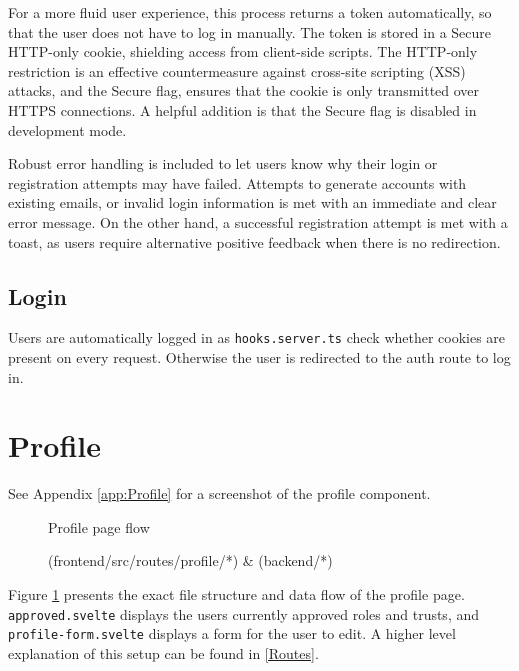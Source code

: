 For a more fluid user experience, this process returns a token automatically, so that the user does not have to log in manually. The token is stored in a Secure HTTP-only cookie, shielding access from client-side scripts. The HTTP-only restriction is an effective countermeasure against cross-site scripting (XSS) attacks, and the Secure flag, ensures that the cookie is only transmitted over HTTPS connections. A helpful addition is that the Secure flag is disabled in development mode.

Robust error handling is included to let users know why their login or registration attempts may have failed. Attempts to generate accounts with existing emails, or invalid login information is met with an immediate and clear error message. On the other hand, a successful registration attempt is met with a toast, as users require alternative positive feedback when there is no redirection.
\subsection{Login}

Users are automatically logged in as \texttt{hooks.server.ts} check whether cookies are present on every request. Otherwise the user is redirected to the auth route to log in.

\section{Profile}
\vspace{-5pt}
{\footnotesize See Appendix \ref{app:Profile} for a screenshot of the profile component.}
\vspace{-5pt}
\begin{figure}[h]
\centering
{}
\vspace{-20pt}
\caption{Profile page flow}
\vspace{-10pt}
\caption*{(frontend/src/routes/profile/*) \& (backend/*)}
\label{fig:profile-file-flow}
\vspace{-20pt}
\end{figure}

Figure \ref{fig:profile-file-flow} presents the exact file structure and data flow of the profile page. \texttt{approved.svelte} displays the users currently approved roles and trusts, and \texttt{profile-form.svelte} displays a form for the user to edit. A higher level explanation of this setup can be found in \ref{Routes}. 

